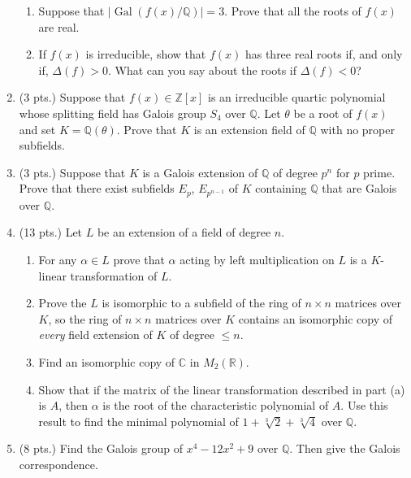 \documentclass[11pt]{report}
\newcommand\ZZ{\mathbb Z}
\newcommand\QQ{\mathbb Q}
\newcommand\R{\mathbb R}
\newcommand\C{\mathbb C}
\newcommand\Gal{\operatorname{Gal}}
\begin{document}
\begin{enumerate}
\begin{enumerate}
\item  Suppose that $\big\vert \Gal( f(x) / \QQ ) \big\vert = 3$.  Prove that all the roots of $f(x)$ are real.

\item  If $f(x)$ is irreducible, show that $f(x)$ has three real roots if, and only if, $\Delta(f) > 0$.  What
can you say about the roots if $\Delta(f) < 0$?

\end{enumerate}

\item (3 pts.) Suppose that $f(x) \in \ZZ[x]$ is an irreducible quartic polynomial whose splitting field has Galois
group $S_4$ over $\QQ$.  Let $\theta$ be a root of $f(x)$ and set $K = \QQ(\theta)$.  Prove that $K$ is an
extension field of $\QQ$ with no proper subfields.

\item (3 pts.) Suppose that $K$ is a Galois extension of $\QQ$ of degree $p^n$ for $p$ prime.  Prove that
there exist subfields $E_p$, $E_{p^{n-1}}$ of $K$ containing $\QQ$ that are Galois over $\QQ$.


\item (13 pts.) Let $L$ be an extension of a field of degree $n$.

\begin{enumerate}

\item For any $\alpha \in L$ prove that $\alpha$ acting by left multiplication on $L$ is a $K$-linear transformation
of $L$.

\item Prove the $L$ is isomorphic to a subfield of the ring of $n \times n$ matrices over $K$, so the ring
of $n \times n$ matrices over $K$ contains an isomorphic copy of \emph{every} field extension of $K$ of
degree $\le n$.

\item Find an isomorphic copy of $\C$ in $M_2(\R)$.

\item Show that if the matrix of the linear transformation described in part (a) is $A$, then $\alpha$ is the
root of the characteristic polynomial of $A$.  Use this result to find the minimal polynomial of 
$1 + \sqrt[3]{2} + \sqrt[3]{4}$ over $\QQ$.

\end{enumerate}

\item (8 pts.) Find the Galois group of $x^4 - 12 x^2 + 9$ over $\QQ$.  Then give the Galois correspondence.


\end{enumerate}
\end{document}
